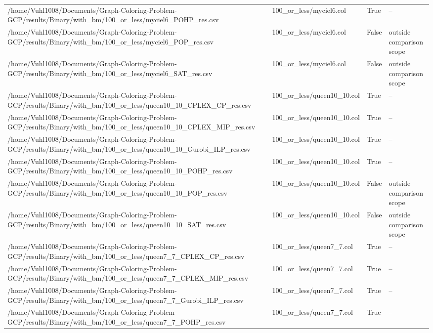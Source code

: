 \begin{table}[htbp]
\begin{tabular}{llll}
/home/Vuhl1008/Documents/Graph-Coloring-Problem-GCP/results/Binary/with\_bm/100\_or\_less/myciel6\_POHP\_res.csv & 100\_or\_less/myciel6.col & True & -- \\
/home/Vuhl1008/Documents/Graph-Coloring-Problem-GCP/results/Binary/with\_bm/100\_or\_less/myciel6\_POP\_res.csv & 100\_or\_less/myciel6.col & False & outside comparison scope \\
/home/Vuhl1008/Documents/Graph-Coloring-Problem-GCP/results/Binary/with\_bm/100\_or\_less/myciel6\_SAT\_res.csv & 100\_or\_less/myciel6.col & False & outside comparison scope \\
/home/Vuhl1008/Documents/Graph-Coloring-Problem-GCP/results/Binary/with\_bm/100\_or\_less/queen10\_10\_CPLEX\_CP\_res.csv & 100\_or\_less/queen10\_10.col & True & -- \\
/home/Vuhl1008/Documents/Graph-Coloring-Problem-GCP/results/Binary/with\_bm/100\_or\_less/queen10\_10\_CPLEX\_MIP\_res.csv & 100\_or\_less/queen10\_10.col & True & -- \\
/home/Vuhl1008/Documents/Graph-Coloring-Problem-GCP/results/Binary/with\_bm/100\_or\_less/queen10\_10\_Gurobi\_ILP\_res.csv & 100\_or\_less/queen10\_10.col & True & -- \\
/home/Vuhl1008/Documents/Graph-Coloring-Problem-GCP/results/Binary/with\_bm/100\_or\_less/queen10\_10\_POHP\_res.csv & 100\_or\_less/queen10\_10.col & True & -- \\
/home/Vuhl1008/Documents/Graph-Coloring-Problem-GCP/results/Binary/with\_bm/100\_or\_less/queen10\_10\_POP\_res.csv & 100\_or\_less/queen10\_10.col & False & outside comparison scope \\
/home/Vuhl1008/Documents/Graph-Coloring-Problem-GCP/results/Binary/with\_bm/100\_or\_less/queen10\_10\_SAT\_res.csv & 100\_or\_less/queen10\_10.col & False & outside comparison scope \\
/home/Vuhl1008/Documents/Graph-Coloring-Problem-GCP/results/Binary/with\_bm/100\_or\_less/queen7\_7\_CPLEX\_CP\_res.csv & 100\_or\_less/queen7\_7.col & True & -- \\
/home/Vuhl1008/Documents/Graph-Coloring-Problem-GCP/results/Binary/with\_bm/100\_or\_less/queen7\_7\_CPLEX\_MIP\_res.csv & 100\_or\_less/queen7\_7.col & True & -- \\
/home/Vuhl1008/Documents/Graph-Coloring-Problem-GCP/results/Binary/with\_bm/100\_or\_less/queen7\_7\_Gurobi\_ILP\_res.csv & 100\_or\_less/queen7\_7.col & True & -- \\
/home/Vuhl1008/Documents/Graph-Coloring-Problem-GCP/results/Binary/with\_bm/100\_or\_less/queen7\_7\_POHP\_res.csv & 100\_or\_less/queen7\_7.col & True & -- \\

\end{tabular}
\end{table}
